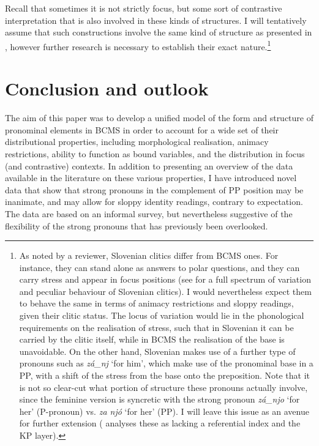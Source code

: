 \documentclass[output=paper,colorlinks,citecolor=brown]{langscibook}
\begin{document}
\noindent Recall that sometimes it is not strictly focus, but some sort of contrastive interpretation that is also involved in these kinds of structures. I will tentatively assume that such constructions involve the same kind of structure as presented in , however further research is necessary to establish their exact nature.\footnote{As noted by a reviewer, Slovenian clitics differ from BCMS ones. For instance, they can stand alone as answers to polar questions, and they can carry stress and appear in focus positions (see \citealt{dvorak07} for a full spectrum of variation and peculiar behaviour of Slovenian clitics). I would nevertheless expect them to behave the same in terms of animacy restrictions and sloppy readings, given their clitic status. The locus of variation would lie in the phonological requirements on the realisation of stress, such that in Slovenian it can be carried by the clitic itself, while in BCMS the realisation of the base is unavoidable. On the other hand, Slovenian makes use of a further type of pronouns such as \textit{z\'{a}\_nj} `for him', which make use of the pronominal base in a PP, with a shift of the stress from the base onto the preposition. Note that it is not so clear-cut what portion of structure these pronouns actually involve, since the feminine version is syncretic with the strong pronoun \textit{z\'{a}\_njo} `for her' (P-pronoun) vs. \textit{za nj\'{o}} `for her' (PP). I will leave this issue as an avenue for further extension (\citealt{stegovec19} analyses these as lacking a referential index and the KP layer).} 

\section{Conclusion and outlook}\label{pus:sec:conclusion}

The aim of this paper was to develop a unified model of the form and structure of pronominal elements in BCMS in order to account for a wide set of their distributional properties, including morphological realisation, animacy restrictions, 
ability to function as bound variables, and the distribution in focus (and contrastive) contexts. In addition to presenting an overview of the data available in the literature on these various properties, I have introduced novel data that show that strong pronouns in the complement of PP position may be inanimate, and may allow for sloppy identity readings, contrary to expectation. The data are based on an informal survey, but nevertheless suggestive of the flexibility of the strong pronouns that has previously been overlooked. 
\end{document}
